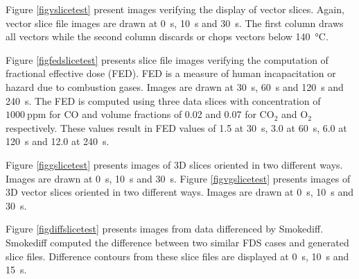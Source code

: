 \documentclass[11pt,twoside]{book}
\begin{document}
Figure \ref{figvslicetest} present images verifying the display of vector slices.
Again, vector slice file images are drawn at \SI{0}{s}, \SI{10}{s} and \SI{30}{s}.
The first column draws all vectors while the second column discards or chops vectors
below \SI{140}{\degreeCelsius}.

Figure \ref{figfedslicetest} presents slice file images verifying the computation
of fractional effective dose (FED).  FED is a measure of human incapacitation or
hazard due to combustion gases\cite{SFPE:Purser}. Images are drawn at \SI{30}{s},
\SI{60}{s} and \SI{120}{s} and \SI{240}{s}. The FED is computed using three data slices with concentration of $1000~\mathrm{ppm}$ for $\mathrm{CO}$ and volume fractions of 0.02 and 0.07 for $\mathrm{CO_2}$ and $\mathrm{O_2}$ respectively. These values result in FED values of 1.5 at \SI{30}{s}, 3.0 at \SI{60}{s}, 6.0 at \SI{120}{s} and 12.0 at \SI{240}{s}.

Figure \ref{figgslicetest} presents images of 3D slices oriented in two different
ways. Images are drawn at \SI{0}{s}, \SI{10}{s} and \SI{30}{s}.
Figure \ref{figvgslicetest} presents images of 3D vector slices oriented in two different
ways. Images are drawn at \SI{0}{s}, \SI{10}{s} and \SI{30}{s}.

Figure \ref{figdiffslicetest} presents images from data differenced by Smokediff.
Smokediff computed the difference between two similar FDS cases and generated slice
files. Difference contours from these slice files are displayed at \SI{0}{s},
\SI{10}{s} and \SI{15}{s}.
\end{document}
